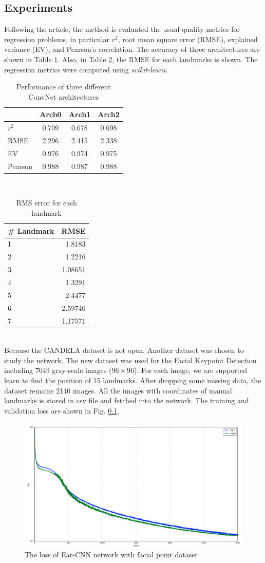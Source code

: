 \subsection{Experiments}
Following the article, the method is evaluated the usual quality metrics for regression problems, in particular $r^2$, root mean square error (RMSE), explained variance (EV), and Pearson's correlation. The accuracy of three architectures are shown in Table \ref{tbear1}. Also, in Table \ref{tbear2}, the RMSE for each landmarks is shown. The regression metrics were computed using \textit{scikit-learn}\cite{}.
\begin{table}[h!]
	\centering
	\begin{tabular}{l c c c}
	& Arch0 & Arch1 & Arch2 \\ \hline
	$r^2$ & 0.709 & 0.678 & 0.698 \\ \hline
	RMSE & 2.296 & 2.415 & 2.338\\ \hline
	EV & 0.976 & 0.974 &  0.975 \\ \hline
	Pearson & 0.988 & 0.987 &  0.988 \\ \hline	
	\end{tabular}
	\caption{Performance of three different ConvNet architectures}
	\label{tbear1}
\end{table}\\
\begin{table}[h!]
	\centering
	\begin{tabular}{l r}
	\# Landmark & RMSE \\ \hline
	1 & 1.8183 \\ \hline
	2 & 1.2216\\ \hline
	3 &  1.08651\\ \hline
	4 &  1.3291\\ \hline
	5 &  2.4477\\ \hline
	6 &  2.59746\\ \hline
	7 &  1.17571\\ \hline
	\end{tabular}
	\caption{RMS error for each landmark}
	\label{tbear2}
\end{table}\\
Because the CANDELA dataset is not open. Another dataset was chosen to study the network. The new dataset was used for the Facial Keypoint Detection including 7049 gray-scale images ($96 \times 96$). For each image, we are supported learn to find the position of 15 landmarks. After dropping some missing data, the dataset remains 2140 images. All the images with coordinates of manual landmarks is stored in csv file and fetched into the network. The training and validation loss are shown in Fig. \ref{}.
\begin{figure}[h!]
	\centering
	\includegraphics[scale=0.27]{images/trainloss}
	\caption{The loss of Ear-CNN network with facial point dataset}
	\label{1Econv}
\end{figure}